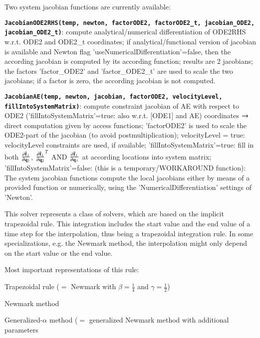Two system jacobian functions are currently available:
\bi
  \item \texttt{\bf JacobianODE2RHS(temp, newton, factorODE2, factorODE2\_t, jacobian\_ODE2, jacobian\_ODE2\_t)}: compute analytical/numerical differentiation of ODE2RHS w.r.t. ODE2 and ODE2\_t coordinates; if analytical/functional version of jacobian is available and Newton flag 'useNumericalDifferentiation'=false, then the according jacobian is computed by its according function; results are 2 jacobians; the factors 'factor\_ODE2' and 'factor\_ODE2\_t' are used to scale the two jacobians; if a factor is zero, the according jacobian is not computed.
	\item \texttt{\bf JacobianAE(temp, newton, jacobian, factorODE2, velocityLevel, fillIntoSystemMatrix)}: 
		compute constraint jacobian of AE with respect to ODE2 ('fillIntoSystemMatrix'=true: also w.r.t. [ODE1] and AE) coordinates $\rightarrow$ direct computation given by access functions; 'factorODE2' is used to scale the ODE2-part of the jacobian (to avoid postmultiplication); velocityLevel = true: velocityLevel constraints are used, if available; 'fillIntoSystemMatrix'=true: fill in both $\frac{\partial \bar {\mathbf{f}}_\lambda}{\partial \mathbf{q}_2}$, $\frac{\partial \bar {\mathbf{f}}_\lambda}{\partial \mathbf{q}_2}^T$ AND $\frac{\partial \bar {\mathbf{f}}_\lambda}{\partial \mathbf{q}_\lambda}$ at according locations into system matrix; 'fillIntoSystemMatrix'=false: (this is a temporary/WORKAROUND function):
\ei
The system jacobian functions compute the local jacobians either by means of a provided function or numerically, using the 'NumericalDifferentiation' settings of 'Newton'.


This solver represents a class of solvers, which are based on the implicit trapezoidal rule. This integration includes the start value and the end value of a time step for the interpolation, thus being a trapezoidal integration rule. In some specializations, e.g. the Newmark method, the interpolation might only depend on the start value or the end value.

Most important representations of this rule:
\bi
  \item Trapezoidal rule ($=$ Newmark with $\beta = \frac 1 4$ and $\gamma = \frac 1 2$) 
	\item Newmark method
	\item Generalized-$\alpha$ method ($=$ generalized Newmark method with additional parameters
\ei


